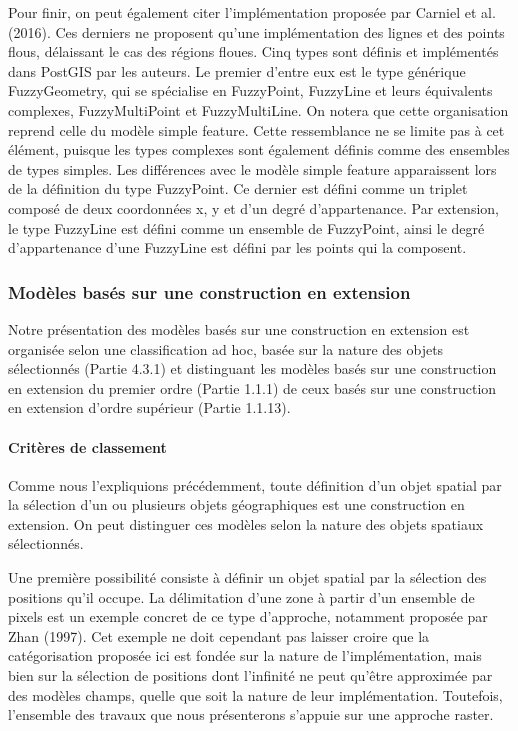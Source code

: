 Pour finir, on peut également citer l’implémentation proposée par
Carniel et al. (2016). Ces derniers ne proposent qu’une implémentation
des lignes et des points flous, délaissant le cas des régions
floues. Cinq types sont définis et implémentés dans PostGIS par les
auteurs. Le premier d’entre eux est le type générique FuzzyGeometry,
qui se spécialise en FuzzyPoint, FuzzyLine et leurs équivalents
complexes, FuzzyMultiPoint et FuzzyMultiLine. On notera que cette
organisation reprend celle du modèle simple feature. Cette
ressemblance ne se limite pas à cet élément, puisque les types
complexes sont également définis comme des ensembles de types
simples. Les différences avec le modèle simple feature apparaissent
lors de la définition du type FuzzyPoint. Ce dernier est défini comme
un triplet composé de deux coordonnées x, y et d’un degré
d’appartenance. Par extension, le type FuzzyLine est défini comme un
ensemble de FuzzyPoint, ainsi le degré d’appartenance d’une FuzzyLine
est défini par les points qui la composent.

\subsubsection{Modèles basés sur une construction en extension}

Notre présentation des modèles basés sur une construction en extension
est organisée selon une classification ad hoc, basée sur la nature des
objets sélectionnés (Partie 4.3.1) et distinguant les modèles basés
sur une construction en extension du premier ordre (Partie 1.1.1) de
ceux basés sur une construction en extension d’ordre supérieur (Partie
1.1.13).

\paragraph{Critères de classement}

Comme nous l’expliquions précédemment, toute définition d’un objet
spatial par la sélection d’un ou plusieurs objets géographiques est
une construction en extension. On peut distinguer ces modèles selon la
nature des objets spatiaux sélectionnés.

Une première possibilité consiste à définir un objet spatial par la
sélection des positions qu’il occupe. La délimitation d’une zone à
partir d’un ensemble de pixels est un exemple concret de ce type
d’approche, notamment proposée par Zhan (1997). Cet exemple ne doit
cependant pas laisser croire que la catégorisation proposée ici est
fondée sur la nature de l’implémentation, mais bien sur la sélection
de positions dont l’infinité ne peut qu’être approximée par des
modèles champs, quelle que soit la nature de leur
implémentation. Toutefois, l’ensemble des travaux que nous
présenterons s’appuie sur une approche raster.

